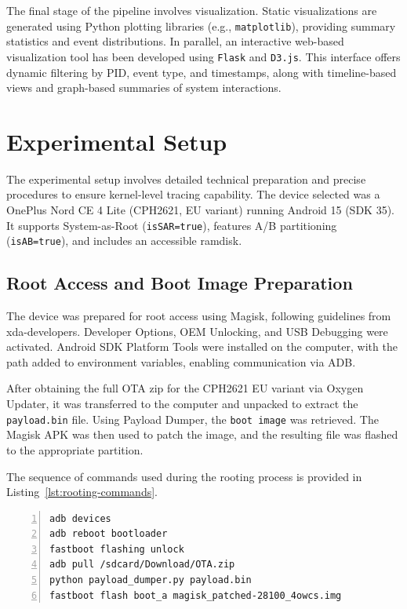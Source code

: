 \documentclass[a4paper,12pt]{report}
\begin{document}
The final stage of the pipeline involves visualization. Static visualizations are generated using Python plotting libraries (e.g., \texttt{matplotlib}), providing summary statistics and event distributions. In parallel, an interactive web-based visualization tool has been developed using \texttt{Flask} and \texttt{D3.js}. This interface offers dynamic filtering by PID, event type, and timestamps, along with timeline-based views and graph-based summaries of system interactions.
\section{Experimental Setup}

The experimental setup involves detailed technical preparation and precise procedures to ensure kernel-level tracing capability. The device selected was a OnePlus Nord CE 4 Lite (CPH2621, EU variant) running Android 15 (SDK 35). It supports System-as-Root (\texttt{isSAR=true}), features A/B partitioning (\texttt{isAB=true}), and includes an accessible ramdisk.

\subsection{Root Access and Boot Image Preparation}

The device was prepared for root access using Magisk, following guidelines from xda-developers. Developer Options, OEM Unlocking, and USB Debugging were activated. Android SDK Platform Tools were installed on the computer, with the path added to environment variables, enabling communication via ADB.

After obtaining the full OTA zip for the CPH2621 EU variant via Oxygen Updater, it was transferred to the computer and unpacked to extract the \texttt{payload.bin} file. Using Payload Dumper, the \texttt{boot image} was retrieved. The Magisk APK was then used to patch the image, and the resulting file was flashed to the appropriate partition.

The sequence of commands used during the rooting process is provided in Listing~\ref{lst:rooting-commands}.

\begin{lstlisting}[language=bash,caption={Rooting commands for device setup},label={lst:rooting-commands},numbers=left]
adb devices
adb reboot bootloader
fastboot flashing unlock
adb pull /sdcard/Download/OTA.zip
python payload_dumper.py payload.bin
fastboot flash boot_a magisk_patched-28100_4owcs.img
\end{lstlisting}
\end{document}
